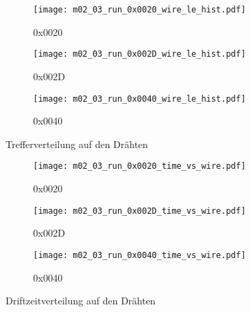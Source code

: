 \documentclass[11pt, ngerman, fleqn, DIV=15, headinclude, BCOR=2cm]{scrreprt}
\begin{document}
\begin{appendix}

	\begin{figure}
		\centering
	\begin{subfigure}[a]{0.45 \textwidth}
		\texttt{[image: m02\_03\_run\_0x0020\_wire\_le\_hist.pdf]}
		\caption{%
			0x0020
		}
		\label{fig:m02_03_run_0x0020_wire_le_hist}
	\end{subfigure}
	\begin{subfigure}[a]{0.45 \textwidth}
		\centering
		\texttt{[image: m02\_03\_run\_0x002D\_wire\_le\_hist.pdf]}
		\caption{%
			0x002D
		}
		\label{fig:m02_03_run_0x002D_wire_le_hist}
	\end{subfigure}
	\begin{subfigure}[a]{0.45 \textwidth}
		\centering
		\texttt{[image: m02\_03\_run\_0x0040\_wire\_le\_hist.pdf]}
		\caption{%
			0x0040
		}
		\label{fig:m02_03_run_0x0040_wire_le_hist}
	\end{subfigure}
	\caption{%
		Trefferverteilung auf den Drähten
	}
	\label{fig:m02_03_wire_le_hist}
	\end{figure}

	\begin{figure}
		\centering
	\begin{subfigure}[a]{0.45 \textwidth}
		\texttt{[image: m02\_03\_run\_0x0020\_time\_vs\_wire.pdf]}
		\caption{%
			0x0020
		}
		\label{fig:m02_03_run_0x0020_time_vs_wire}
	\end{subfigure}
	\begin{subfigure}[a]{0.45 \textwidth}
		\texttt{[image: m02\_03\_run\_0x002D\_time\_vs\_wire.pdf]}
		\caption{%
			0x002D
		}
		\label{fig:m02_03_run_0x002D_time_vs_wire}
	\end{subfigure}
	\begin{subfigure}[a]{0.45 \textwidth}
		\texttt{[image: m02\_03\_run\_0x0040\_time\_vs\_wire.pdf]}
		\caption{%
			0x0040
		}
		\label{fig:m02_03_run_0x0040_time_vs_wire}
	\end{subfigure}
	\caption{%
		Driftzeitverteilung auf den Drähten
	}
	\label{fig:m02_03_time_vs_wire}
	\end{figure}


\end{appendix}
\end{document}
